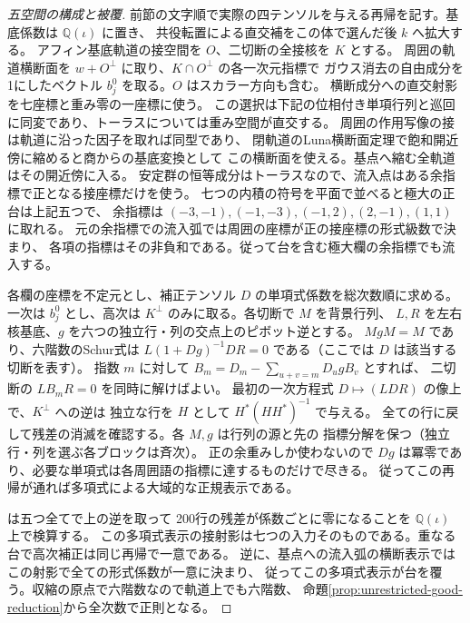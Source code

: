 \begin{proof}[五空間の構成と被覆]
前節の文字順で実際の四テンソルを与える再帰を記す。基底係数は $\mathbb Q(\iota)$ に置き、
共役転置による直交補をこの体で選んだ後 $k$ へ拡大する。
アフィン基底軌道の接空間を $O$、二切断の全接核を $K$ とする。
周囲の軌道横断面を $w+O^\perp$ に取り、$K\cap O^\perp$ の各一次元指標で
ガウス消去の自由成分を1にしたベクトル $b_j^0$ を取る。$O$ はスカラー方向も含む。
横断成分への直交射影を七座標と重み零の一座標に使う。
この選択は下記の位相付き単項行列と巡回に同変であり、トーラスについては重み空間が直交する。
周囲の作用写像の接は軌道に沿った因子を取れば同型であり、
閉軌道のLuna横断面定理で飽和開近傍に縮めると商からの基底変換として
この横断面を使える。基点へ縮む全軌道はその開近傍に入る。
安定群の恒等成分はトーラスなので、流入点はある余指標で正となる接座標だけを使う。
七つの内積の符号を平面で並べると極大の正台は上記五つで、
余指標は $(-3,-1),(-1,-3),(-1,2),(2,-1),(1,1)$ に取れる。
元の余指標での流入弧では周囲の座標が正の接座標の形式級数で決まり、
各項の指標はその非負和である。従って台を含む極大欄の余指標でも流入する。

各欄の座標を不定元とし、補正テンソル $D$ の単項式係数を総次数順に求める。
一次は $b_j^0$ とし、高次は $K^\perp$ のみに取る。各切断で $M$ を背景行列、
$L,R$ を左右核基底、$g$ を六つの独立行・列の交点上のピボット逆とする。
$MgM=M$ であり、六階数のSchur式は
$L(1+Dg)^{-1}DR=0$ である（ここでは $D$ は該当する切断を表す）。
指数 $m$ に対して $B_m=D_m-\sum_{u+v=m}D_u g B_v$ とすれば、
二切断の $LB_mR=0$ を同時に解けばよい。
最初の一次方程式 $D\mapsto (LDR)$ の像上で、$K^\perp$ への逆は
独立な行を $H$ として $H^*(HH^*)^{-1}$ で与える。
全ての行に戻して残差の消滅を確認する。各 $M,g$ は行列の源と先の
指標分解を保つ（独立行・列を選ぶ各ブロックは斉次）。
正の余重みしか使わないので $Dg$ は冪零であり、必要な単項式は各周囲語の指標に達するものだけで尽きる。
従ってこの再帰が通れば多項式による大域的な正規表示である。

 は五つ全てで上の逆を取って
200行の残差が係数ごとに零になることを $\mathbb Q(\iota)$ 上で検算する。
この多項式表示の接射影は七つの入力そのものである。重なる台で高次補正は同じ再帰で一意である。
逆に、基点への流入弧の横断表示ではこの射影で全ての形式係数が一意に決まり、
従ってこの多項式表示が台を覆う。収縮の原点で六階数なので軌道上でも六階数、
命題\ref{prop:unrestricted-good-reduction}から全次数で正則となる。
\end{proof}
